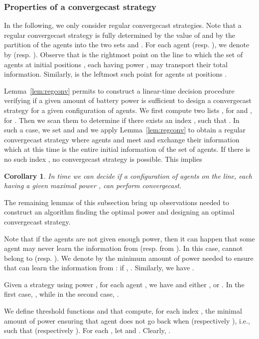 \documentclass{article}
\newtheorem{corollary}{Corollary}
\newcommand\convergecast{convergecast\xspace}
\begin{document}
\subsubsection{Properties of a {\convergecast} strategy}\label{sec-properties}

In the following, we only consider regular convergecast strategies. Note that a
regular convergecast strategy is fully determined by the value of  and by the
partition of the agents into the two sets  and . For each
agent  (resp.  ), we denote  by
 (resp. ). Observe that
 is the rightmost point on the line to which the set
of  agents at initial positions , each having power ,
may transport their total information. Similarly,
 is the leftmost such point for agents at positions
.
 
Lemma~\ref{lem:regconv} permits to construct a linear-time decision
procedure verifying if a given amount  of battery power is
sufficient to design a convergecast strategy for a given configuration
 of agents.  We first compute two lists ,
for  and , for . Then we scan them to determine if there exists an index , such
that . In such a case, we set
 and  and we apply
Lemma~\ref{lem:regconv} to obtain a regular \convergecast strategy where
agents  and  meet and exchange their information which
at this time is the entire initial information of the set of agents. If
there is no such index , no {\convergecast} strategy is
possible. This implies

\begin{corollary}
In  time we can decide if a configuration of  agents on the
line, each having a given maximal power , can perform
{\convergecast}.
\end{corollary}

The remaining lemmas of this subsection bring up observations needed 
to construct an algorithm finding the optimal power  and designing an optimal {\convergecast} strategy.

Note that if the agents are not given enough power, then it can happen
that some agent  may never learn the information from  (resp.
from ). In this case,  cannot belong to 
(resp. ). We denote by  the minimum amount of power
needed to ensure that  can learn the
information from : if , . Similarly, we have .

Given a strategy using power , for each agent , we have
 and either , or
. In the first case, , while in the second case, . 

We define threshold functions  and  that compute, for
each index , the minimal amount of power ensuring that agent  
does not go back when 
(respectively ), i.e., such that  (respectively ).  
For each , let  and . Clearly, .
\end{document}
